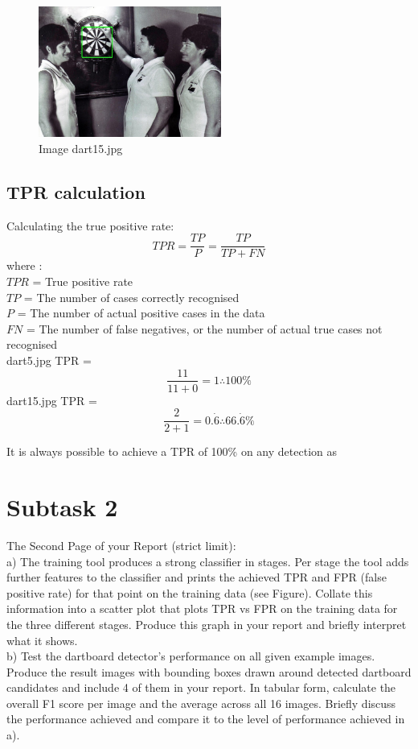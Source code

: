 \documentclass[conference]{IEEEtran}
\begin{document}
\begin{figure}[ht!]
\centering
\includegraphics[width=60mm]{img/detected_dart15.jpg}
\caption{Image dart15.jpg \label{img_face_15}}
\end{figure}

\subsection{TPR calculation}

Calculating the true positive rate:
\[TPR = \frac{TP}{P} = \frac{TP}{TP+FN}\]
where :\\
$TPR$ = True positive rate \\
$TP$ = The number of cases correctly recognised \\
$P$ = The number of actual positive cases in the data\\
$FN$ = The number of false negatives, or the number of actual true cases not recognised\\

dart5.jpg TPR = 
\[\frac{11}{11+0} = 1 \therefore 100\%\]
dart15.jpg TPR = 
\[\frac{2}{2+1} = 0.\dot{6} \therefore 66.\dot{6}\%\]

It is always possible to achieve a TPR of 100\% on any detection as 

\newpage

\section{Subtask 2}

The Second Page of your Report (strict limit):\\
a) The training tool produces a strong classifier in stages. Per
stage the tool adds further features to the classifier and
prints the achieved TPR and FPR (false positive rate) for
that point on the training data (see Figure). Collate this
information into a scatter plot that plots TPR vs FPR on the
training data for the three different stages. Produce this
graph in your report and briefly interpret what it shows.\\
b) Test the dartboard detector’s performance on all given
example images. Produce the result images with bounding
boxes drawn around detected dartboard candidates and
include 4 of them in your report. In tabular form, calculate
the overall F1 score per image and the average across all
16 images. Briefly discuss the performance achieved and
compare it to the level of performance achieved in a).
\end{document}
